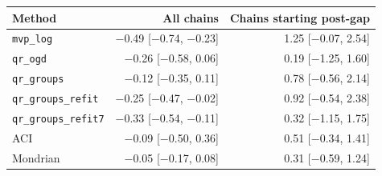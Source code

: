 \begin{tabular}{@{}lrr@{}}
\toprule
Method & All chains & Chains starting post-gap \\
\midrule
\texttt{mvp\_log} & $-$0.49 [$-$0.74, $-$0.23] & 1.25 [$-$0.07, 2.54] \\
\texttt{qr\_ogd} & $-$0.26 [$-$0.58, 0.06] & 0.19 [$-$1.25, 1.60] \\
\texttt{qr\_groups} & $-$0.12 [$-$0.35, 0.11] & 0.78 [$-$0.56, 2.14] \\
\texttt{qr\_groups\_refit} & $-$0.25 [$-$0.47, $-$0.02] & 0.92 [$-$0.54, 2.38] \\
\texttt{qr\_groups\_refit7} & $-$0.33 [$-$0.54, $-$0.11] & 0.32 [$-$1.15, 1.75] \\
ACI & $-$0.09 [$-$0.50, 0.36] & 0.51 [$-$0.34, 1.41] \\
Mondrian & $-$0.05 [$-$0.17, 0.08] & 0.31 [$-$0.59, 1.24] \\
\bottomrule
\end{tabular}
